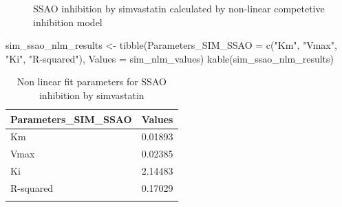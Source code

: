 \documentclass[
  letterpaper,
  DIV=11,
  numbers=noendperiod]{scrreprt}
\newenvironment{Shaded}{\begin{snugshade}}{\end{snugshade}}
\newcommand{\AttributeTok}[1]{\textcolor[rgb]{0.40,0.45,0.13}{#1}}
\newcommand{\FunctionTok}[1]{\textcolor[rgb]{0.28,0.35,0.67}{#1}}
\newcommand{\NormalTok}[1]{\textcolor[rgb]{0.00,0.23,0.31}{#1}}
\newcommand{\OtherTok}[1]{\textcolor[rgb]{0.00,0.23,0.31}{#1}}
\newcommand{\StringTok}[1]{\textcolor[rgb]{0.13,0.47,0.30}{#1}}
\begin{document}
\begin{figure}[H]


\caption{\label{fig-SIM-CI}SSAO inhibition by simvastatin calculated by
non-linear competetive inhibition model}

\end{figure}%

\begin{Shaded}
\begin{Highlighting}[]
\NormalTok{sim\_ssao\_nlm\_results }\OtherTok{\textless{}{-}} \FunctionTok{tibble}\NormalTok{(}\AttributeTok{Parameters\_SIM\_SSAO =} \FunctionTok{c}\NormalTok{(}\StringTok{"Km"}\NormalTok{, }\StringTok{"Vmax"}\NormalTok{, }\StringTok{"Ki"}\NormalTok{, }\StringTok{"R{-}squared"}\NormalTok{), }
                               \AttributeTok{Values =}\NormalTok{ sim\_nlm\_values)}
\FunctionTok{kable}\NormalTok{(sim\_ssao\_nlm\_results)}
\end{Highlighting}
\end{Shaded}

\begin{longtable}[]{@{}ll@{}}

\toprule\noalign{}
Parameters\_SIM\_SSAO & Values \\
\midrule\noalign{}
\endhead
\bottomrule\noalign{}
\endlastfoot
Km & 0.01893 \\
Vmax & 0.02385 \\
Ki & 2.14483 \\
R-squared & 0.17029 \\

\caption{\label{tbl-sim-nlm-parameters}Non linear fit parameters for
SSAO inhibition by simvastatin}

\tabularnewline

\end{longtable}
\end{document}
